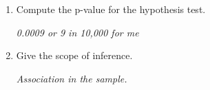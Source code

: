 \begin{enumerate}
\begin{enumerate}
  $H_a$
\begin{students}
 \vspace{1cm}      
\end{students}
\begin{key}
  {\it  $\beta_1 > 0$   We don't expect a negative relationship.}
\end{key}

     \item Compute the p-value for the hypothesis test.
\begin{students}
  \vspace{1.5cm}
\end{students} 

\begin{key}
  {\it 0.0009  or 9 in 10,000 for me}
\end{key}

     \item Give the scope of inference.
\begin{students}
  \vspace{1.5cm}
\end{students} 

\begin{key}
  {\it Association in the sample.}
\end{key}

     \end{enumerate}


\end{enumerate}
